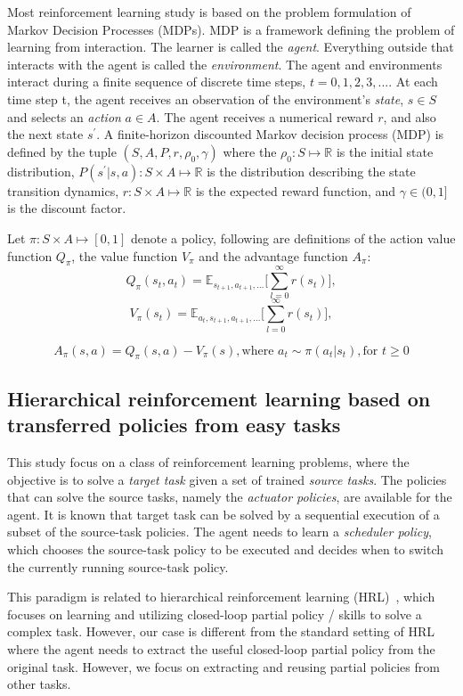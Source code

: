Most reinforcement learning study is based on the problem formulation of Markov Decision Processes (MDPs). MDP is a framework defining the problem of learning from interaction. The learner is called the \textit{agent}. Everything outside that interacts with the agent is called the \textit{environment}.
The agent and environments interact during a finite sequence of discrete time steps, $t=0,1,2,3,...$. At each time step t, the agent receives an observation of the environment's \textit{state}, $s \in S$ and selects an \textit{action} $a \in A$. The agent receives a numerical reward $r$, and also the next state $s^\prime$.  A finite-horizon discounted Markov decision process (MDP) is defined by the tuple $(S,A,P,r,\rho_0,\gamma) $ where the $\rho_0 : S \mapsto \mathbb{R}$ is the initial state distribution, $P(s^\prime|s,a) : S \times A \mapsto \mathbb{R}$ is the distribution describing the state transition dynamics, $r : S \times A \mapsto \mathbb{R}$ is the expected reward function, and $\gamma \in (0,1]$ is the discount factor.

Let $\pi : S \times A \mapsto [0,1] $ denote a policy, following are definitions of the action value function $Q_\pi $, the value function $V_\pi $ and the advantage function $A_\pi $:
$$ Q_\pi(s_t,a_t) = \mathbb{E}_{s_{t+1},a_{t+1},\ldots}
\big[ \sum_{l=0}^\infty r(s_{t}) \big],$$
$$ V_\pi(s_t) = \mathbb{E}_{a_{t},s_{t+1},a_{t+1},\ldots}
\big[ \sum_{l=0}^\infty r(s_{t}) \big],$$

$$ A_\pi (s,a) = Q_\pi (s,a) - V_\pi (s), \text{where } a_t \sim \pi (a_t|s_t), \text{for } t \geq 0 $$


\subsection{Hierarchical reinforcement learning based on transferred policies from easy tasks}\label{sec_hier_trans}

This study focus on a class of reinforcement learning problems, where the objective is to solve a \textit{target task } given a set of trained \textit{source tasks}. The policies that can solve the source tasks, namely the \textit{actuator policies}, are available for the agent. It is known that target task can be solved by a sequential execution of a subset of the source-task policies. The agent needs to learn a \textit{scheduler policy}, which chooses the source-task policy to be executed and decides when to switch the currently running source-task policy.

This paradigm is related to hierarchical reinforcement learning (HRL)~\cite{barto2003recent}, which focuses on learning and utilizing closed-loop partial policy / skills to solve a complex task. However, our case is different from the standard setting of HRL where the agent needs to extract the useful closed-loop partial policy from the original task. However, we focus on extracting and reusing partial policies from other tasks.

